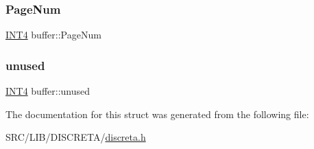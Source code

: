 \mbox{\label{structbuffer_a76311739997d50ee769712e3073f40f7}} 
\subsubsection{\texorpdfstring{Page\+Num}{PageNum}}
{\footnotesize\ttfamily \mbox{\hyperlink{galois_8h_a6675ac57b948be915e03c09228b57b05}{I\+N\+T4}} buffer\+::\+Page\+Num}

\mbox{\label{structbuffer_a30679a361b5a72146a3705d997655446}} 
\subsubsection{\texorpdfstring{unused}{unused}}
{\footnotesize\ttfamily \mbox{\hyperlink{galois_8h_a6675ac57b948be915e03c09228b57b05}{I\+N\+T4}} buffer\+::unused}



The documentation for this struct was generated from the following file\+:\begin{DoxyCompactItemize}
\item 
S\+R\+C/\+L\+I\+B/\+D\+I\+S\+C\+R\+E\+T\+A/\mbox{\hyperlink{discreta_8h}{discreta.\+h}}\end{DoxyCompactItemize}
